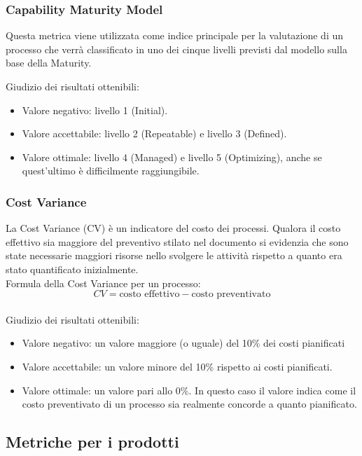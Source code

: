 \documentclass[a4paper, titlepage]{article}
\begin{document}
\subsubsection{Capability Maturity Model}
\label{par:cmm}
Questa metrica viene utilizzata come indice principale per la valutazione di un processo che verrà classificato in uno dei cinque livelli previsti dal modello sulla base della Maturity.
\par Giudizio dei risultati ottenibili:
\begin{itemize}
\item Valore negativo: livello 1 (Initial).
\item Valore accettabile: livello 2 (Repeatable) e livello 3 (Defined).
\item Valore ottimale: livello 4 (Managed) e livello 5 (Optimizing), anche se quest'ultimo è difficilmente raggiungibile.
\end{itemize}

\subsubsection{Cost Variance}
\label{par:CV}
La Cost Variance (CV) è un indicatore del costo dei processi. Qualora il costo effettivo sia maggiore del preventivo stilato nel documento  si evidenzia che sono state necessarie maggiori risorse nello svolgere le attività rispetto a quanto era stato quantificato inizialmente.
\\Formula della Cost Variance per un processo:
\begin{displaymath}
CV= \mbox{costo effettivo} - \mbox{costo preventivato}
\end{displaymath}
\\ Giudizio dei risultati ottenibili:
\begin{itemize}
\item Valore negativo: un valore maggiore (o uguale) del 10\% dei costi pianificati
\item Valore accettabile: un valore minore del 10\% rispetto ai costi pianificati.
\item Valore ottimale: un valore pari allo 0\%. In questo caso il valore indica come il costo preventivato di un processo sia realmente concorde a quanto pianificato. 
\end{itemize}

\subsection{Metriche per i prodotti}
\end{document}
